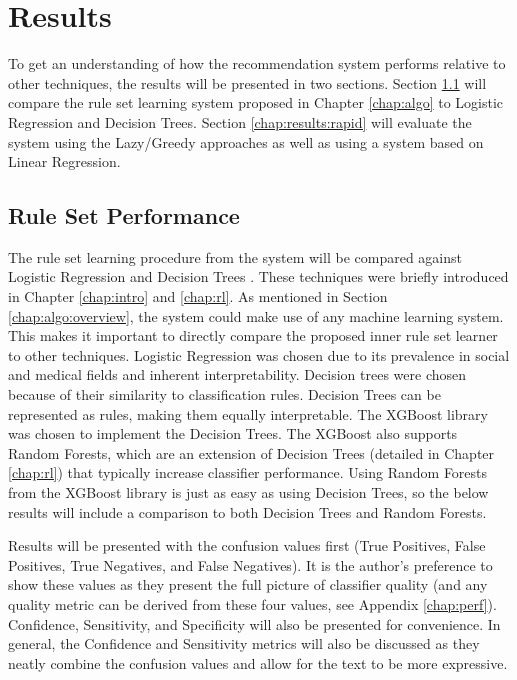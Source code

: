 \chapter{Results} \label{chap:results}

To get an understanding of how the \Abb recommendation system performs relative to other techniques, the results will be presented in two sections. Section \ref{chap:results:sets} will compare the rule set learning system proposed in Chapter \ref{chap:algo} to Logistic Regression and Decision Trees. Section \ref{chap:results:rapid} will evaluate the \Abb system using the Lazy/Greedy approaches as well as using a \Abb system based on Linear Regression.


\section{Rule Set Performance}\label{chap:results:sets}

The rule set learning procedure from the \Abb system will be compared against Logistic Regression  \cite{hastie2009elements} and Decision Trees \cite{chen2016xgboost}. These techniques were briefly introduced in Chapter \ref{chap:intro} and \ref{chap:rl}. As mentioned in Section \ref{chap:algo:overview}, the \Abb system could make use of any machine learning system. This makes it important to directly compare the proposed inner rule set learner to other techniques.
Logistic Regression was chosen due to its prevalence in social and medical fields \cite{allegheny2019homeless} \cite{hong2018applications} \cite{toros2019early} and inherent interpretability.
Decision trees were chosen because of their similarity to classification rules. Decision Trees can be represented as rules, making them equally interpretable. The XGBoost library \cite{chen2016xgboost} was chosen to implement the Decision Trees. The XGBoost also supports Random Forests, which are an extension of Decision Trees (detailed in Chapter \ref{chap:rl}) that typically increase classifier performance. Using Random Forests from the XGBoost library is just as easy as using Decision Trees, so the below results will include a comparison to both Decision Trees and Random Forests.

Results will be presented with the confusion values first (True Positives, False Positives, True Negatives, and False Negatives). It is the author's preference to show these values as they present the full picture of classifier quality (and any quality metric can be derived from these four values, see Appendix \ref{chap:perf}). Confidence, Sensitivity, and Specificity will also be presented for convenience. In general, the Confidence and Sensitivity metrics will also be discussed as they neatly combine the confusion values and allow for the text to be more expressive.



